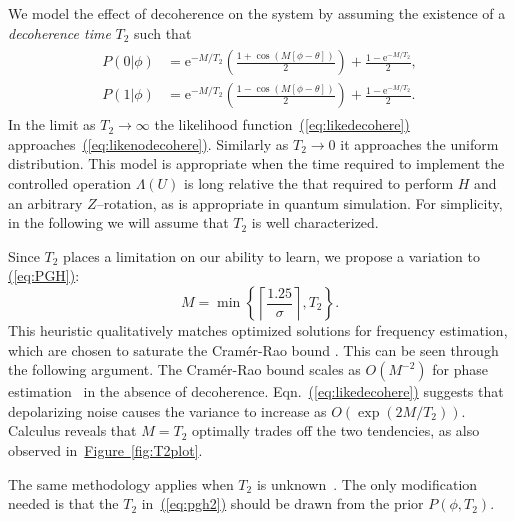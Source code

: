 \documentclass[aps,pra,amsmath,twocolumn,amssymb,superscriptaddress]{revtex4-1}
\newcommand{\eq}[1]{\hyperref[eq:#1]{(\ref*{eq:#1})}}
\newcommand{\fig}[1]{\hyperref[fig:#1]{Figure~\ref*{fig:#1}}}
\newcommand{\ee}{\mathrm{e}}
\begin{document}
We model the effect of decoherence on the system by assuming the existence of a \emph{decoherence time} $T_2$ such that
\begin{gather}
    \label{eq:likedecohere}
    \begin{aligned}
        P(0|\phi) & = \ee^{-M/T_2}\left(\frac{1+\cos(M[\phi -\theta])}{2}\right)+\frac{1-\ee^{-M/T_2}}{2},\\
        P(1|\phi) & = \ee^{-M/T_2}\left(\frac{1-\cos(M[\phi -\theta])}{2}\right)+\frac{1-\ee^{-M/T_2}}{2}.
    \end{aligned}
\end{gather}
In the limit as $T_2\rightarrow \infty$ the likelihood function~\eq{likedecohere} approaches~\eq{likenodecohere}.  Similarly as $T_2\rightarrow 0$ it approaches the uniform distribution.  This model is appropriate when the time required to implement the controlled operation $\Lambda(U)$ is long relative the that required to perform $H$ and an arbitrary $Z$--rotation, as is appropriate in quantum simulation.  For simplicity, in the following we will assume that $T_2$ is well characterized. 
 

Since $T_2$ places a limitation on our ability to learn, we propose a variation to \eq{PGH}:
\begin{equation}
M=\min\left\{\left\lceil\frac{1.25}{\sigma}\right\rceil, T_2 \right\}.\label{eq:pgh2}
\end{equation}
This heuristic qualitatively matches optimized solutions for
frequency estimation, which are chosen to saturate the Cram\'er-Rao bound \cite{ferrie_how_2013}.
This can be seen through the following argument.  The Cram\'er-Rao bound scales as $O(M^{-2})$ for phase estimation~\cite{WGC15} in the absence of decoherence.  Eqn.~\eq{likedecohere} suggests that depolarizing noise causes the variance to increase as $O(\exp(2M/T_2))$.  Calculus reveals that $M=T_2$ optimally trades off the two tendencies, as also observed in~\fig{T2plot}.


The same methodology applies when
$T_2$ is unknown~\cite{granade_robust_2012}.  The only modification needed is that the $T_2$
 in~\eq{pgh2} should be drawn from the prior
$P(\phi,T_2)$.
\end{document}
